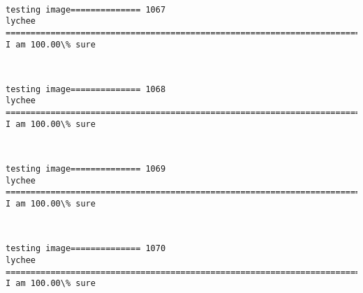 \documentclass[11pt]{article}
\begin{document}
    \begin{center}
    \end{center}
    { \hspace*{\fill} \\}
    
    \begin{Verbatim}[commandchars=\\\{\}]
testing image============== 1067
lychee
============================================================================
I am 100.00\% sure

    \end{Verbatim}

    \begin{center}
    \end{center}
    { \hspace*{\fill} \\}
    
    \begin{Verbatim}[commandchars=\\\{\}]
testing image============== 1068
lychee
============================================================================
I am 100.00\% sure

    \end{Verbatim}

    \begin{center}
    \end{center}
    { \hspace*{\fill} \\}
    
    \begin{Verbatim}[commandchars=\\\{\}]
testing image============== 1069
lychee
============================================================================
I am 100.00\% sure

    \end{Verbatim}

    \begin{center}
    \end{center}
    { \hspace*{\fill} \\}
    
    \begin{Verbatim}[commandchars=\\\{\}]
testing image============== 1070
lychee
============================================================================
I am 100.00\% sure

    \end{Verbatim}
\end{document}
